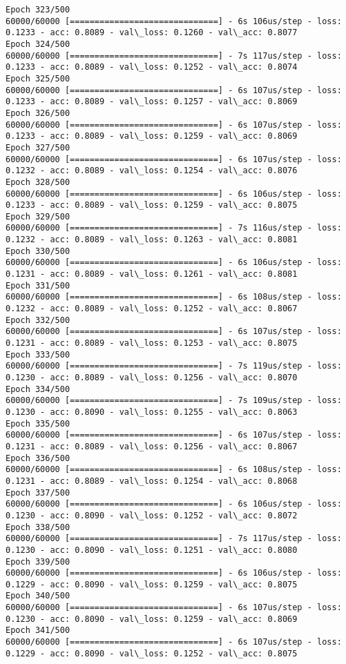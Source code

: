 \documentclass[11pt]{article}
\begin{document}
\begin{Verbatim}[commandchars=\\\{\}]
Epoch 323/500
60000/60000 [==============================] - 6s 106us/step - loss: 0.1233 - acc: 0.8089 - val\_loss: 0.1260 - val\_acc: 0.8077
Epoch 324/500
60000/60000 [==============================] - 7s 117us/step - loss: 0.1233 - acc: 0.8089 - val\_loss: 0.1252 - val\_acc: 0.8074
Epoch 325/500
60000/60000 [==============================] - 6s 107us/step - loss: 0.1233 - acc: 0.8089 - val\_loss: 0.1257 - val\_acc: 0.8069
Epoch 326/500
60000/60000 [==============================] - 6s 107us/step - loss: 0.1233 - acc: 0.8089 - val\_loss: 0.1259 - val\_acc: 0.8069
Epoch 327/500
60000/60000 [==============================] - 6s 107us/step - loss: 0.1232 - acc: 0.8089 - val\_loss: 0.1254 - val\_acc: 0.8076
Epoch 328/500
60000/60000 [==============================] - 6s 106us/step - loss: 0.1233 - acc: 0.8089 - val\_loss: 0.1259 - val\_acc: 0.8075
Epoch 329/500
60000/60000 [==============================] - 7s 116us/step - loss: 0.1232 - acc: 0.8089 - val\_loss: 0.1263 - val\_acc: 0.8081
Epoch 330/500
60000/60000 [==============================] - 6s 106us/step - loss: 0.1231 - acc: 0.8089 - val\_loss: 0.1261 - val\_acc: 0.8081
Epoch 331/500
60000/60000 [==============================] - 6s 108us/step - loss: 0.1232 - acc: 0.8089 - val\_loss: 0.1252 - val\_acc: 0.8067
Epoch 332/500
60000/60000 [==============================] - 6s 107us/step - loss: 0.1231 - acc: 0.8089 - val\_loss: 0.1253 - val\_acc: 0.8075
Epoch 333/500
60000/60000 [==============================] - 7s 119us/step - loss: 0.1230 - acc: 0.8089 - val\_loss: 0.1256 - val\_acc: 0.8070
Epoch 334/500
60000/60000 [==============================] - 7s 109us/step - loss: 0.1230 - acc: 0.8090 - val\_loss: 0.1255 - val\_acc: 0.8063
Epoch 335/500
60000/60000 [==============================] - 6s 107us/step - loss: 0.1231 - acc: 0.8089 - val\_loss: 0.1256 - val\_acc: 0.8067
Epoch 336/500
60000/60000 [==============================] - 6s 108us/step - loss: 0.1231 - acc: 0.8089 - val\_loss: 0.1254 - val\_acc: 0.8068
Epoch 337/500
60000/60000 [==============================] - 6s 106us/step - loss: 0.1230 - acc: 0.8090 - val\_loss: 0.1252 - val\_acc: 0.8072
Epoch 338/500
60000/60000 [==============================] - 7s 117us/step - loss: 0.1230 - acc: 0.8090 - val\_loss: 0.1251 - val\_acc: 0.8080
Epoch 339/500
60000/60000 [==============================] - 6s 106us/step - loss: 0.1229 - acc: 0.8090 - val\_loss: 0.1259 - val\_acc: 0.8075
Epoch 340/500
60000/60000 [==============================] - 6s 107us/step - loss: 0.1230 - acc: 0.8090 - val\_loss: 0.1259 - val\_acc: 0.8069
Epoch 341/500
60000/60000 [==============================] - 6s 107us/step - loss: 0.1229 - acc: 0.8090 - val\_loss: 0.1252 - val\_acc: 0.8075

\end{Verbatim}
\end{document}
